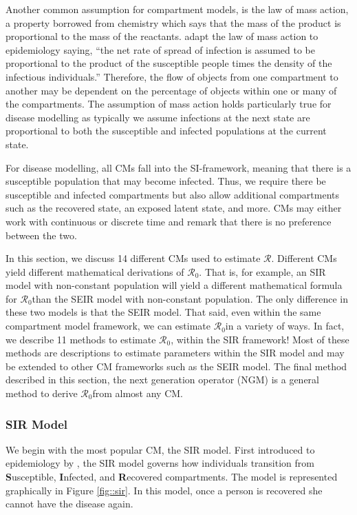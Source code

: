 \documentclass[12pt]{article}
\newcommand{\rr}{\ensuremath{\mathcal{R}_0}}
\begin{document}
Another common assumption for compartment models, is the law of mass action, a property borrowed from chemistry which says that the mass of the product is proportional to the mass of the reactants.  \cite{anderson1992} adapt the law of mass action to epidemiology saying, ``the net rate of spread of infection is assumed to be proportional to the product of the susceptible people times the density of the infectious individuals.''  Therefore, the flow of objects from one compartment to another may be dependent on the percentage of objects within one or many of the compartments.  The assumption of mass action holds particularly true for disease modelling as typically we assume infections at the next state are proportional to both the susceptible and infected populations at the current state.

For disease modelling, all CMs fall into the SI-framework, meaning that there is a susceptible population that may become infected.  Thus, we require there be susceptible and infected compartments but also allow additional compartments such as the recovered state, an exposed latent state, and more.  CMs may either work with continuous or discrete time and \cite{getz2006} remark that there is no preference between the two.

In this section, we discuss 14 different CMs used to estimate $\mathcal{R}$.  Different CMs yield different mathematical derivations of \rr.  That is, for example, an SIR model with non-constant population will yield a different mathematical formula for \rr than the SEIR model with non-constant population.  The only difference in these two models is that the SEIR model.  That said, even within the same compartment model framework, we can estimate \rr in a variety of ways.  In fact, we describe 11 methods to estimate \rr, within the SIR framework!  Most of these methods are descriptions to estimate parameters within the SIR model and may be extended to other CM frameworks such as the SEIR model.  The final method described in this section, the next generation operator (NGM) is a general method to derive \rr from almost any CM.




\subsubsection{SIR Model}
\label{sec:sir-model}

We begin with the most popular CM, the SIR model.   First introduced to epidemiology by  \cite{Kermack700}, the SIR model governs how individuals transition from \textbf{S}usceptible, \textbf{I}nfected, and \textbf{R}ecovered compartments.  The model is represented graphically in Figure \ref{fig::sir}.  In this model, once a person is recovered she cannot have the disease again.
\end{document}
